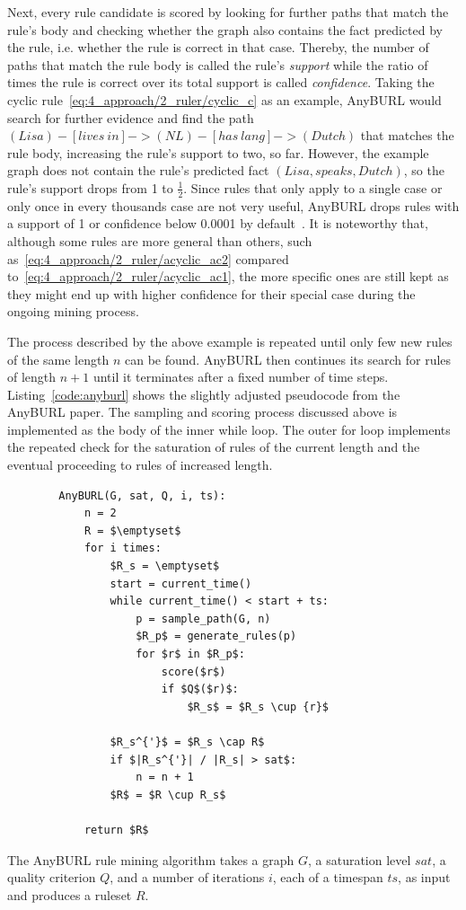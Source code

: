 Next, every rule candidate is scored by looking for further paths that match the rule's body and checking whether the graph also contains the fact predicted by the rule, i.e. whether the rule is correct in that case. Thereby, the number of paths that match the rule body is called the rule's \emph{support} while the ratio of times the rule is correct over its total support is called \emph{confidence}. Taking the cyclic rule~\ref{eq:4_approach/2_ruler/cyclic_c} as an example, AnyBURL would search for further evidence and find the path $(Lisa) - [lives~in] -> (NL) - [has~lang] -> (Dutch)$ that matches the rule body, increasing the rule's support to two, so far. However, the example graph does not contain the rule's predicted fact $(Lisa, speaks, Dutch)$, so the rule's support drops from 1 to $\frac{1}{2}$. Since rules that only apply to a single case or only once in every thousands case are not very useful, AnyBURL drops rules with a support of 1 or confidence below 0.0001 by default~\cite{AnyBURL}. It is noteworthy that, although some rules are more general than others, such as~\ref{eq:4_approach/2_ruler/acyclic_ac2} compared to~\ref{eq:4_approach/2_ruler/acyclic_ac1}, the more specific ones are still kept as they might end up with higher confidence for their special case during the ongoing mining process.

The process described by the above example is repeated until only few new rules of the same length $n$ can be found. AnyBURL then continues its search for rules of length $n + 1$ until it terminates after a fixed number of time steps. Listing~\ref{code:anyburl} shows the slightly adjusted pseudocode from the AnyBURL paper. The sampling and scoring process discussed above is implemented as the body of the inner while loop. The outer for loop implements the repeated check for the saturation of rules of the current length and the eventual proceeding to rules of increased length.


\begin{listing}[t]
    \begin{lstlisting}
        AnyBURL(G, sat, Q, i, ts):
            n = 2
            R = $\emptyset$
            for i times:
                $R_s = \emptyset$
                start = current_time()
                while current_time() < start + ts:
                    p = sample_path(G, n)
                    $R_p$ = generate_rules(p)
                    for $r$ in $R_p$:
                        score($r$)
                        if $Q$($r)$:
                            $R_s$ = $R_s \cup {r}$

                $R_s^{'}$ = $R_s \cap R$
                if $|R_s^{'}| / |R_s| > sat$:
                    n = n + 1
                $R$ = $R \cup R_s$

            return $R$
    \end{lstlisting}
    \caption{The AnyBURL rule mining algorithm takes a graph $G$, a saturation level $sat$, a quality criterion $Q$, and a number of iterations $i$, each of a timespan $ts$, as input and produces a ruleset $R$.}
    \label{code:anyburl}
\end{listing}

